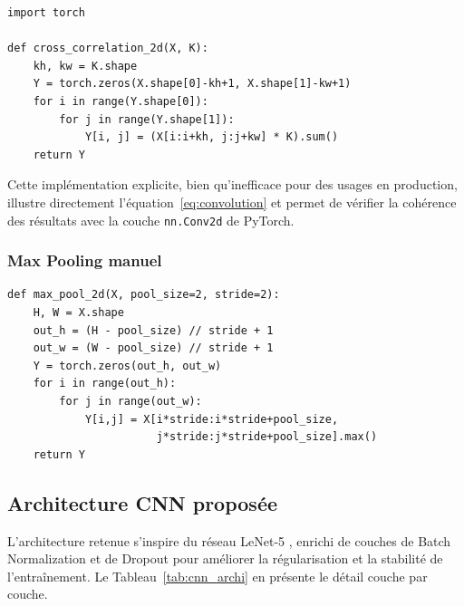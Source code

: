 \documentclass[11pt,a4paper]{article}
\begin{document}
\begin{lstlisting}[caption={Implémentation manuelle de la corrélation croisée 2D.},
                   label={lst:cross_corr}]
import torch

def cross_correlation_2d(X, K):
    kh, kw = K.shape
    Y = torch.zeros(X.shape[0]-kh+1, X.shape[1]-kw+1)
    for i in range(Y.shape[0]):
        for j in range(Y.shape[1]):
            Y[i, j] = (X[i:i+kh, j:j+kw] * K).sum()
    return Y
\end{lstlisting}

Cette implémentation explicite, bien qu'inefficace pour des usages en production,
illustre directement l'équation~\eqref{eq:convolution} et permet de vérifier la
cohérence des résultats avec la couche \texttt{nn.Conv2d} de PyTorch.

\subsubsection{Max Pooling manuel}

\begin{lstlisting}[caption={Implémentation manuelle du max pooling 2D.},
                   label={lst:max_pool}]
def max_pool_2d(X, pool_size=2, stride=2):
    H, W = X.shape
    out_h = (H - pool_size) // stride + 1
    out_w = (W - pool_size) // stride + 1
    Y = torch.zeros(out_h, out_w)
    for i in range(out_h):
        for j in range(out_w):
            Y[i,j] = X[i*stride:i*stride+pool_size,
                       j*stride:j*stride+pool_size].max()
    return Y
\end{lstlisting}

\subsection{Architecture CNN proposée}

L'architecture retenue s'inspire du réseau LeNet-5 \cite{lecun1998gradient}, enrichi
de couches de Batch Normalization et de Dropout pour améliorer la régularisation
et la stabilité de l'entraînement. Le Tableau~\ref{tab:cnn_archi} en présente
le détail couche par couche.
\end{document}
